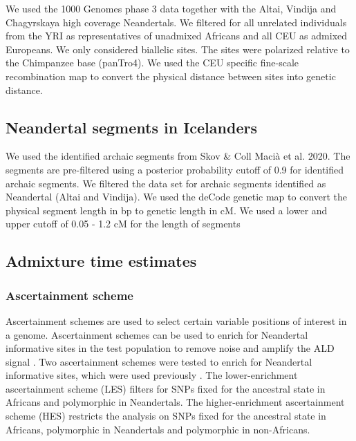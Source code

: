 \documentclass[]{article}
\begin{document}
We used the 1000 Genomes phase 3 data together with the Altai, Vindija and Chagyrskaya high coverage Neandertals.  We filtered for all unrelated individuals from the YRI as representatives of unadmixed Africans and all CEU as admixed Europeans. We only considered biallelic sites. The sites were polarized relative to the Chimpanzee base (panTro4). We used the CEU specific fine-scale recombination map \citep{spence_inference_2019} to convert the physical distance between sites into genetic distance. 

\subsection{Neandertal segments in Icelanders}\label{1000 Genomes Data}

We used the identified archaic segments from Skov \& Coll Maci\`{a} et al. 2020. The segments are pre-filtered using a posterior probability cutoff of 0.9 for identified archaic segments. We filtered the data set for archaic segments identified as Neandertal (Altai and Vindija). We used the deCode genetic map to convert the physical segment length in bp to genetic length in cM. We used a lower and upper cutoff of 0.05 - 1.2 cM for the length of segments

\subsection{Admixture time estimates}\label{admixture time estimates}

\subsubsection{Ascertainment scheme}\label{asceteinment scheme}

Ascertainment schemes are used to select certain variable positions of
interest in a genome. Ascertainment schemes can be used to enrich for
Neandertal informative sites in the test population to remove noise and
amplify the ALD signal \citep{sankararaman_date_2012}. Two
ascertainment schemes were tested to enrich for Neandertal informative
sites, which were used previously
\citep{sankararaman_date_2012,fu_genome_2014}. The lower-enrichment
ascertainment scheme (LES) filters for SNPs fixed for the ancestral state in
Africans and polymorphic in Neandertals. The higher-enrichment
ascertainment scheme (HES) restricts the analysis on SNPs fixed for the
ancestral state in Africans, polymorphic in Neandertals and polymorphic
in non-Africans.
\end{document}

